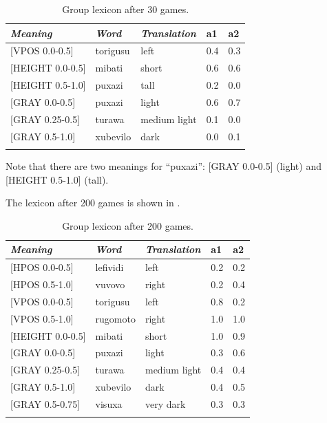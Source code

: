 \begin{table} 
\begin{center}
\begin{tabular}{ l  l  l  l  l }
\lsptoprule
{\itshape Meaning}&{\itshape Word}&{\itshape Translation} & {\bfshape  a1}&{\bfshape  a2} \\ \midrule
{}[VPOS 0.0-0.5] &torigusu&left&0.4&0.3\\ 
{}[HEIGHT 0.0-0.5]&mibati&short &0.6&0.6\\ 
{}[HEIGHT 0.5-1.0]&puxazi&tall &0.2&0.0\\ 
{}[GRAY 0.0-0.5]& puxazi&light &0.6&0.7\\ 
{}[GRAY 0.25-0.5]&turawa&medium light&0.1&0.0\\ 
{}[GRAY 0.5-1.0]& xubevilo&dark &0.0&0.1\\ 
\lspbottomrule
\end{tabular}
\caption{\label{tab:after30} Group lexicon after 30 games.}
\end{center}
\end{table}

Note that there are two meanings for ``puxazi'': 
{}[GRAY 0.0-0.5] (light) and [HEIGHT 0.5-1.0] (tall). 

The lexicon after 200 games is shown in . 


\begin{table} 
\begin{center}
\begin{tabular}{ l  l  l  l  l }
\lsptoprule
{\itshape Meaning}&{\itshape Word}&{\itshape Translation} & {\bfshape  a1}&{\bfshape  a2} \\ \midrule
{}[HPOS 0.0-0.5] &lefividi&left&0.2&0.2\\ 
{}[HPOS 0.5-1.0] &vuvovo&right&0.2&0.4\\ 
{}[VPOS 0.0-0.5] &torigusu&left&0.8&0.2\\ 
{}[VPOS 0.5-1.0] &rugomoto&right&1.0&1.0\\ 
{}[HEIGHT 0.0-0.5]&mibati&short &1.0&0.9\\ 
{}[GRAY 0.0-0.5]& puxazi&light &0.3&0.6\\ 
{}[GRAY 0.25-0.5]&turawa&medium light&0.4&0.4\\ 
{}[GRAY 0.5-1.0]& xubevilo&dark &0.4&0.5\\ 
{}[GRAY 0.5-0.75]& visuxa&very dark &0.3&0.3\\ 
\lspbottomrule
\end{tabular}
\caption{\label{tab:after200} Group lexicon after 200 games.}
\end{center}
\end{table}

